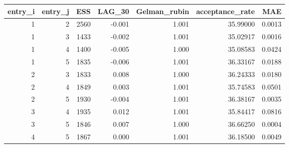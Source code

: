 \begin{longtable}{rrrrrrr}
\toprule
entry\_i & entry\_j & ESS & LAG\_30 & Gelman\_rubin & acceptance\_rate & MAE \\ 
\midrule
1 & 2 & 2560 & -0.001 & 1.001 & 35.99000 & 0.0013 \\ 
1 & 3 & 1433 & -0.002 & 1.001 & 35.02917 & 0.0016 \\ 
1 & 4 & 1400 & -0.005 & 1.000 & 35.08583 & 0.0424 \\ 
1 & 5 & 1835 & -0.006 & 1.001 & 36.33167 & 0.0188 \\ 
2 & 3 & 1833 & 0.008 & 1.000 & 36.24333 & 0.0180 \\ 
2 & 4 & 1849 & 0.003 & 1.001 & 35.74583 & 0.0501 \\ 
2 & 5 & 1930 & -0.004 & 1.001 & 36.38167 & 0.0035 \\ 
3 & 4 & 1935 & 0.012 & 1.001 & 35.84417 & 0.0816 \\ 
3 & 5 & 1846 & 0.007 & 1.000 & 36.66250 & 0.0004 \\ 
4 & 5 & 1867 & 0.000 & 1.001 & 36.18500 & 0.0049 \\ 
\bottomrule
\end{longtable}

